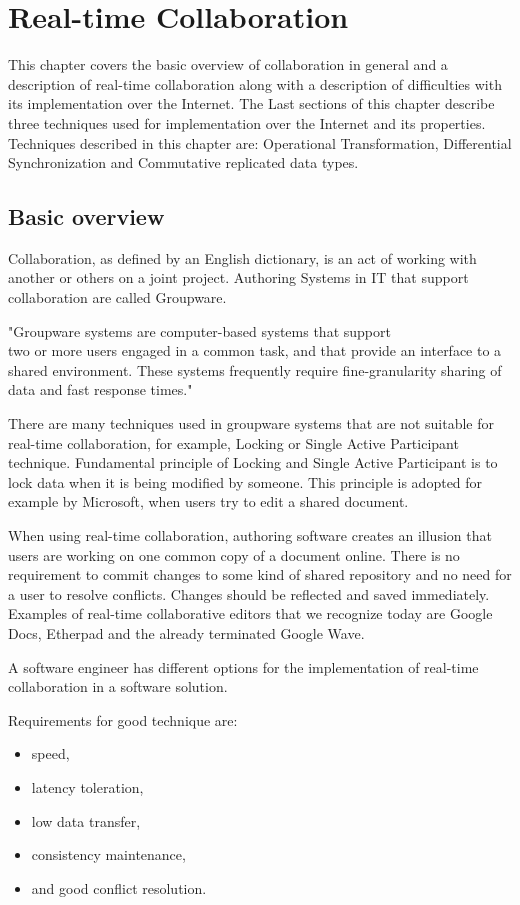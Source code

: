 \documentclass[12pt,oneside]{fithesis2}
\begin{document}
\chapter{Real-time Collaboration}
This chapter covers the basic overview of collaboration in general and a description of real-time collaboration along with a description of difficulties with its implementation over the Internet. The Last sections of this chapter describe three techniques used for implementation over the Internet and its properties. Techniques described in this chapter are: Operational Transformation, Differential Synchronization and Commutative replicated data types.
\section{Basic overview}
Collaboration, as defined by an English dictionary, is an act of working with another or others on a joint project. Authoring Systems in IT that support collaboration are called Groupware. \par "Groupware systems are computer-based systems that support \\two or more users engaged in a common task, and that provide an interface to a shared environment. These systems frequently require fine-granularity sharing of data and fast response times." \cite{Ellis} \par There are many techniques used in groupware systems that are not suitable for real-time collaboration, for example, Locking or Single Active Participant technique. Fundamental principle of Locking and Single Active Participant is to lock data when it is being modified by someone. This principle is adopted for example by Microsoft, when users try to edit a shared document. \par When using real-time collaboration, authoring software creates an illusion that users are working on one common copy of a document online. There is no requirement to commit changes to some kind of shared repository and no need for a user to resolve conflicts. Changes should be reflected and saved immediately. Examples of real-time collaborative editors that we recognize today are Google Docs, Etherpad and the already terminated Google Wave. \par A software engineer has different options for the implementation of real-time collaboration in a software solution. \par Requirements for good technique are: 
\begin{itemize}
\item speed,
\item latency toleration,
\item low data transfer,
\item consistency maintenance,
\item and good conflict resolution.
\end{itemize}
\end{document}
